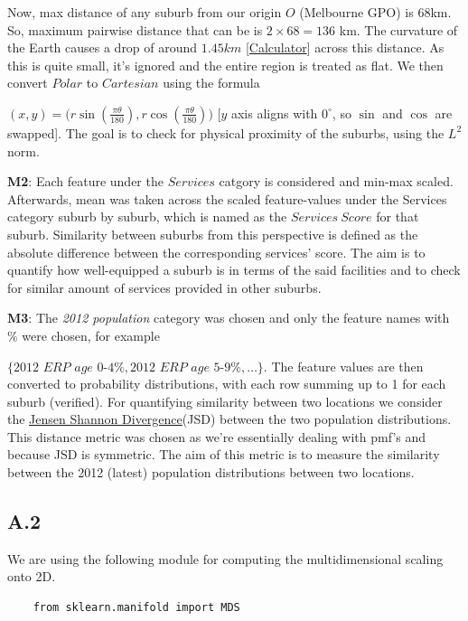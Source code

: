 \documentclass[
	a4paper, %
	10pt, %
	unnumberedsections, %
	twoside, %
]{LTJournalArticle}
\begin{document}
Now, max distance of any suburb from our origin $O$ (Melbourne GPO) is 68km. So, maximum pairwise distance that can be is $2\times 68=136$ km. The curvature of the Earth causes a drop of around $1.45km$ [\href{https://earthcurvature.com/}{Calculator}] across this distance. As this is quite small, it's ignored and the entire region is treated as flat. We then convert $Polar$ to $Cartesian$ using the formula 

$(x, y) = \big(r\sin\left(\frac{\pi\theta}{180}\right), r\cos\left(\frac{\pi\theta}{180}\right)\big)$ [$y$ axis aligns with $0^\circ$, so $\sin$ and $\cos$ are swapped]. The goal is to check for physical proximity of the suburbs, using the $L^2$ norm.

\textbf{M2}: Each feature under the $Services$ catgory is considered and min-max scaled. Afterwards, mean was taken across the scaled feature-values under the Services category suburb by suburb, which is named as the $Services \ Score$ for that suburb. Similarity between suburbs from this perspective is defined as the absolute difference between the corresponding services' score. The aim is to quantify how well-equipped a suburb is in terms of the said facilities and to check for similar amount of services provided in other suburbs.

\textbf{M3}: The \textit{2012 population} category was chosen and only the feature names with $\%$ were chosen, for example

$\{ \textit{2012 ERP age 0-4\%}, \textit{2012 ERP age 5-9\%}, \dots\}$. The feature values are then converted to probability distributions, with each row summing up to 1 for each suburb (verified). For quantifying similarity between two locations we consider the \href{https://en.wikipedia.org/wiki/Jensen%E2%80%93Shannon_divergence}{Jensen Shannon Divergence}(JSD) between the two population distributions. This distance metric was chosen as we're essentially dealing with pmf's and because JSD is symmetric. The aim of this metric is to measure the similarity between the 2012 (latest) population distributions between two locations.



\subsection{A.2}

We are using the following module for computing the multidimensional scaling onto 2D.
\begin{verbatim}
    from sklearn.manifold import MDS
\end{verbatim}
\end{document}

